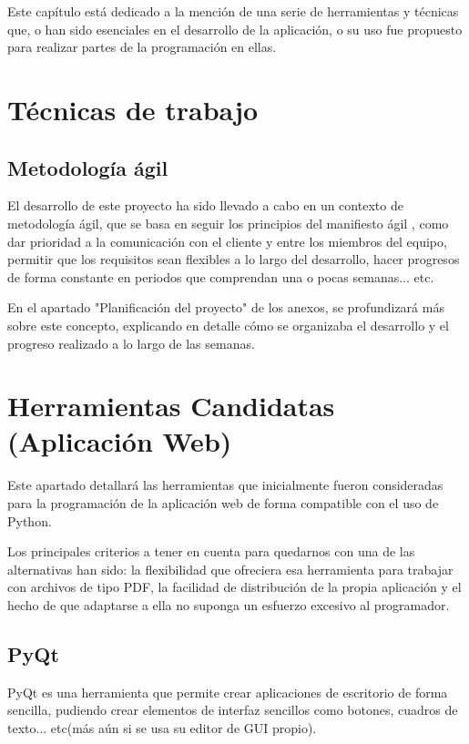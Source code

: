 
Este capítulo está dedicado a la mención de una serie de herramientas y técnicas que, o han sido esenciales en el desarrollo de la aplicación, o su uso fue propuesto para realizar partes de la programación en ellas.

\section{Técnicas de trabajo}

\subsection{Metodología ágil}

El desarrollo de este proyecto ha sido llevado a cabo en un contexto de metodología ágil, que se basa en seguir los principios del manifiesto ágil \cite{fowler2001agile}, como dar prioridad a la comunicación con el cliente y entre los miembros del equipo, permitir que los requisitos sean flexibles a lo largo del desarrollo, hacer progresos de forma constante en periodos que comprendan una o pocas semanas... etc.

En el apartado "Planificación del proyecto" de los anexos, se profundizará más sobre este concepto, explicando en detalle cómo se organizaba el desarrollo y el progreso realizado a lo largo de las semanas.

\section{Herramientas Candidatas (Aplicación Web)}
Este apartado detallará las herramientas que inicialmente fueron consideradas para la programación de la aplicación web de forma compatible con el uso de Python.


Los principales criterios a tener en cuenta para quedarnos con una de las alternativas han sido: la flexibilidad que ofreciera esa herramienta para trabajar con archivos de tipo PDF, la facilidad de distribución de la propia aplicación y el hecho de que adaptarse a ella no suponga un esfuerzo excesivo al programador.

\subsection{PyQt}

PyQt es una herramienta \cite{wiki:pyqt} que permite crear aplicaciones de escritorio de forma sencilla, pudiendo crear elementos de interfaz sencillos como botones, cuadros de texto... etc(más aún si se usa su editor de GUI propio).

